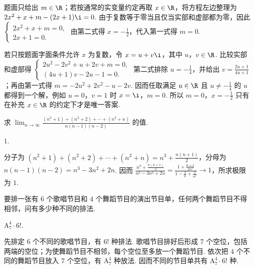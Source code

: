 \begin{solution}
题面只给出 \(m\in\R\)；若按通常的实变量约定再取 \(x\in\R\)，将方程左边整理为 \(2x^{2}+x+m-(2x+1)\i=0\). 由于复数等于零当且仅当实部和虚部都为零，因此
\(\begin{cases}
2x^{2}+x+m=0,\\
2x+1=0.
\end{cases}\)
由第二式得 \(x=-\frac{1}{2}\)，代入第一式得 \(m=0\).

若只按题面字面条件允许 \(x\) 为复数，令 \(x=u+v\i\)，其中 \(u\)，\(v\in\R\). 比较实部和虚部得
\(\begin{cases}
2u^{2}-2v^{2}+u+2v+m=0,\\
(4u+1)v-2u-1=0.
\end{cases}\)
第二式排除 \(u=-\frac{1}{4}\)，并给出 \(v=\frac{2u+1}{4u+1}\)；再由第一式得 \(m=-2u^{2}+2v^{2}-u-2v\). 因而任取满足 \(u\in\R\) 且 \(u\ne-\frac{1}{4}\) 的 \(u\) 都得到一个解，例如 \(u=0\)，\(v=1\) 时 \(x=\i\)，\(m=0\). 所以 \(m=0\)，\(x=-\frac{1}{2}\) 只有在补充 \(x\in\R\) 的约定下才是唯一答案.
\end{solution}

\begin{problem}

求 \(\displaystyle\lim_{n\to\infty}\frac{(n^2 + 1) + (n^2 + 2) + \cdots + (n^2 + n)}{n(n - 1)(n - 2)}\) 的值\fillinblank{}.
\end{problem}

\begin{answer}
\(1\).
\end{answer}

\begin{solution}
分子为 \((n^{2}+1)+(n^{2}+2)+\cdots+(n^{2}+n)=n^{3}+\frac{n(n+1)}{2}\)，分母为 \(n(n-1)(n-2)=n^{3}-3n^{2}+2n\). 因而 \(\displaystyle\frac{n^{3}+\frac{n(n+1)}{2}}{n^{3}-3n^{2}+2n}=\frac{1+\frac{n+1}{2n^{2}}}{1-\frac{3}{n}+\frac{2}{n^{2}}}\to1\)，所求极限为 \(1\).
\end{solution}

\begin{problem}

要排一张有 \(6\) 个歌唱节目和 \(4\) 个舞蹈节目的演出节目单，任何两个舞蹈节目不得相邻，问有多少种不同的排法\fillinblank{}.
\end{problem}

\begin{answer}
\(\mathrm A_7^4\cdot 6!\).
\end{answer}

\begin{solution}
先排定 \(6\) 个不同的歌唱节目，有 \(6!\) 种排法. 歌唱节目排好后形成 \(7\) 个空位，包括两端的空位；为使舞蹈节目不相邻，每个空位至多放一个舞蹈节目. 依次把 \(4\) 个不同的舞蹈节目放入 \(7\) 个空位，有 \(\mathrm A_7^4\) 种放法. 因而不同的节目单共有 \(\mathrm A_7^4\cdot6!\) 种.
\end{solution}

